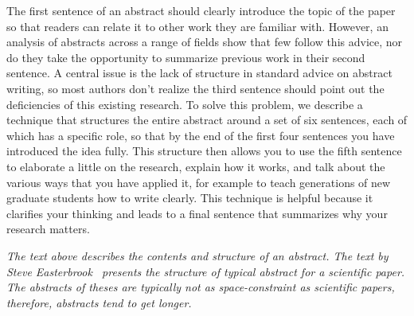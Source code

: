The first sentence of an abstract should clearly introduce the topic of the paper so that readers can relate it to other work they are familiar with.
However, an analysis of abstracts across a range of fields show that few follow this advice, nor do they take the opportunity to summarize previous work in their second sentence.
A central issue is the lack of structure in standard advice on abstract writing, so most authors don’t realize the third sentence should point out the deficiencies of this existing research.
To solve this problem, we describe a technique that structures the entire abstract around a set of six sentences, each of which has a specific role, so that by the end of the first four sentences you have introduced the idea fully.
This structure then allows you to use the fifth sentence to elaborate a little on the research, explain how it works, and talk about the various ways that you have applied it, for example to teach generations of new graduate students how to write clearly.
This technique is helpful because it clarifies your thinking and leads to a final sentence that summarizes why your research matters.

\textit{The text above describes the contents and structure of an abstract.
The text by Steve Easterbrook~\cite{abstractwriting} presents the structure of typical abstract for a scientific paper.
The abstracts of theses are typically not as space-constraint as scientific papers, therefore, abstracts tend to get longer.}
